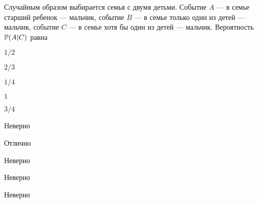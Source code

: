 
\begin{question}
Случайным образом выбирается семья с двумя детьми. Событие \(A\) — в
семье старший ребенок — мальчик, событие \(B\) — в семье только один
из детей — мальчик, событие \(C\) — в семье хотя бы один из детей
--- мальчик. Вероятность \(\P(A | C)\) равна
\begin{answerlist}
  \item \(1/2\)
  \item \(2/3\)
  \item \(1/4\)
  \item \(1\)
  \item \(3/4\)
\end{answerlist}
\end{question}

\begin{solution}
\begin{answerlist}
  \item Неверно
  \item Отлично
  \item Неверно
  \item Неверно
  \item Неверно
\end{answerlist}
\end{solution}

